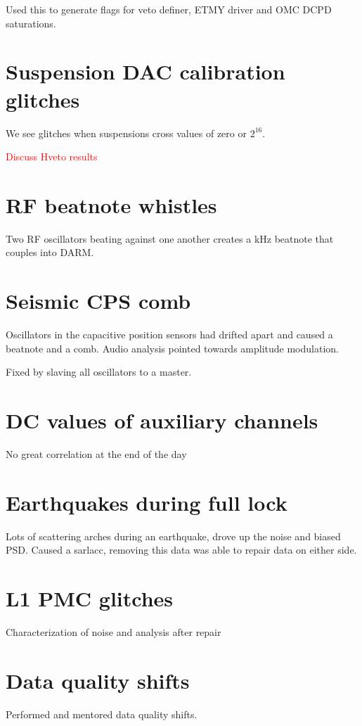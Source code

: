 Used this to generate flags for veto definer, ETMY driver and OMC DCPD saturations.

\section{Suspension DAC calibration glitches}

We see glitches when suspensions cross values of zero or $2^{16}$.

\textcolor{red}{Discuss Hveto results}

\section{RF beatnote whistles}

Two RF oscillators beating against one another creates a kHz beatnote that couples 
into DARM.

\section{Seismic CPS comb}

Oscillators in the capacitive position sensors had drifted apart and caused a 
beatnote and a comb. Audio analysis pointed towards amplitude modulation. 

Fixed by slaving all oscillators to a master.

\section{DC values of auxiliary channels}

No great correlation at the end of the day 

\section{Earthquakes during full lock}

Lots of scattering arches during an earthquake, drove up the noise and biased PSD.
Caused a sarlacc, removing this data was able to repair data on either side.

\section{L1 PMC glitches}


Characterization of noise and analysis after repair

\section{Data quality shifts}
Performed and mentored data quality shifts.



